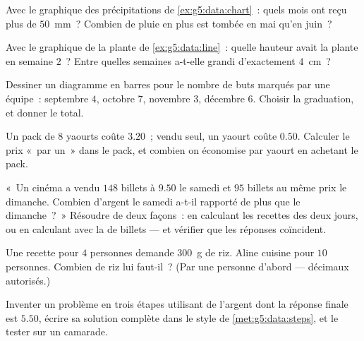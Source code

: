 \begin{exercise}[$\star$]\label{exo:g5:data:5}
Avec le graphique des précipitations de \cref{ex:g5:data:chart}~:
quels mois ont reçu plus de $50$~mm~? Combien de pluie en plus est
tombée en mai qu'en juin~?
\end{exercise}

\begin{exercise}[$\star$]\label{exo:g5:data:6}
Avec le graphique de la plante de \cref{ex:g5:data:line}~: quelle
hauteur avait la plante en semaine $2$~? Entre quelles semaines
a-t-elle grandi d'exactement $4$~cm~?
\end{exercise}

\begin{exercise}[$\star$]\label{exo:g5:data:7}
Dessiner un diagramme en barres pour le nombre de buts marqués par
une équipe~: septembre $4$, octobre $7$, novembre $3$, décembre
$6$. Choisir la graduation, et donner le total.
\end{exercise}

\begin{exercise}[$\star$]\label{exo:g5:data:8}
Un pack de $8$ yaourts coûte $3.20$~; vendu seul, un yaourt coûte
$0.50$. Calculer le prix «~par un~» dans le pack, et combien on
économise par yaourt en achetant le pack.
\end{exercise}

\begin{exercise}[$\star\star$]\label{exo:g5:data:9}
«~Un cinéma a vendu $148$ billets à $9.50$ le samedi et $95$
billets au même prix le dimanche. Combien d'argent le samedi a-t-il
rapporté de plus que le dimanche~?~» Résoudre de deux façons~: en
calculant les recettes des deux jours, ou en calculant avec la
\emph{} de billets --- et vérifier que les réponses
coïncident.
\end{exercise}

\begin{exercise}[$\star\star$]\label{exo:g5:data:10}
Une recette pour $4$ personnes demande $300$~g de riz. Aline
cuisine pour $10$ personnes. Combien de riz lui faut-il~? (Par une
personne d'abord --- décimaux autorisés.)
\end{exercise}

\begin{exercise}[$\star\star$]\label{exo:g5:data:11}
Inventer un problème en trois étapes utilisant de l'argent dont la
réponse finale est $5.50$, écrire sa solution complète dans le
style de \cref{met:g5:data:steps}, et le tester sur un camarade.
\end{exercise}
